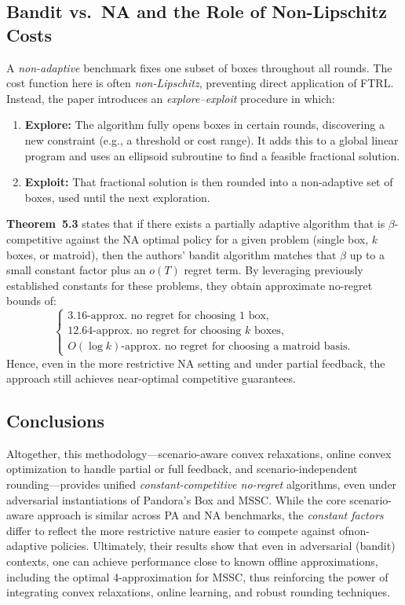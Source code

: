 \documentclass[11pt,a4paper]{article}
\begin{document}
\subsection*{Bandit vs.\ NA and the Role of Non-Lipschitz Costs}
A \emph{non-adaptive} benchmark fixes one subset of boxes throughout all rounds. The cost function here is often \emph{non-Lipschitz}, preventing direct application of FTRL. Instead, the paper introduces an \emph{explore--exploit} procedure in which:
\begin{enumerate}
\item \textbf{Explore:} The algorithm fully opens boxes in certain rounds, discovering a new constraint (e.g., a threshold or cost range).  It adds this to a global linear program and uses an ellipsoid subroutine to find a feasible fractional solution.
\item \textbf{Exploit:} That fractional solution is then rounded into a non-adaptive set of boxes, used until the next exploration.
\end{enumerate}
\textbf{Theorem~5.3} states that if there exists a partially adaptive algorithm that is $\beta$-competitive against the NA optimal policy for a given problem (single box, $k$ boxes, or matroid), then the authors’ bandit algorithm matches that $\beta$ up to a small constant factor plus an $o(T)$ regret term. By leveraging previously established constants for these problems, they obtain approximate no-regret bounds of:
\[
\begin{cases}
3.16\text{-approx.\ no regret for choosing 1 box,}\\
12.64\text{-approx.\ no regret for choosing $k$ boxes,}\\
O(\log k)\text{-approx.\ no regret for choosing a matroid basis.}
\end{cases}
\]
Hence, even in the more restrictive NA setting and under partial feedback, the approach still achieves near-optimal competitive guarantees.

\subsection*{Conclusions}
Altogether, this methodology---scenario-aware convex relaxations, online convex optimization to handle partial or full feedback, and scenario-independent rounding---provides unified \emph{constant-competitive no-regret} algorithms, even under adversarial instantiations of Pandora’s Box and MSSC. While the core scenario-aware approach is similar across PA and NA benchmarks, the \emph{constant factors} differ to reflect the more restrictive nature easier to compete against ofnon-adaptive policies. Ultimately, their results show that even in adversarial (bandit) contexts, one can achieve performance close to known offline approximations, including the optimal 4-approximation for MSSC, thus reinforcing the power of integrating convex relaxations, online learning, and robust rounding techniques.
\end{document}
